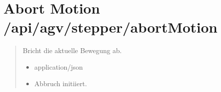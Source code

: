\documentclass[letterpaper,10pt,english]{sphinxmanual}
\begin{document}
\section{Abort Motion \textendash{} /api/agv/stepper/abortMotion}
\label{\detokenize{agv_rest_api_stepper:abort-motion-api-agv-stepper-abortmotion}}\label{\detokenize{agv_rest_api_stepper:post-api-agv-stepper-abortmotion}}

\begin{fulllineitems}
\label{\detokenize{agv_rest_api_stepper:post--api-agv-stepper-abortMotion}}
\pysigstartsignatures
\pysigline
{}
\pysigstopsignatures\begin{quote}\begin{description}
\sphinxAtStartPar
Bricht die aktuelle Bewegung ab.

\begin{itemize}
\item {} 
\sphinxAtStartPar
{} \textendash{} application/json

\end{itemize}

\begin{itemize}
\item {} 
\sphinxAtStartPar
{} \textendash{} Abbruch initiiert.

\end{itemize}

\end{description}\end{quote}

\end{fulllineitems}


\sphinxAtStartPar
{}

\begin{sphinxVerbatim}[commandchars=\\\{\}]
\end{sphinxVerbatim}
\end{document}
